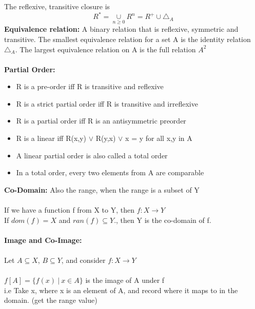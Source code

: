 \documentclass[a4paper,10pt]{article}
\begin{document}
\newline 
The reflexive, transitive closure is 
\begin{equation*}
R^{*} = \underset{n \geq 0}{\cup} R^{n} = R^{+}\cup \triangle_{A}
\end{equation*}
\newline
\textcolor{BlueGreen}{\textbf{Equivalence relation:}} A binary relation that is reflexive, symmetric and transitive. The smallest equivalence relation for a set A is the identity relation $\triangle_{A}$. The largest equivalence relation on A is the full relation $A^{2}$\\\\
\textcolor{BlueGreen}{\textbf{Partial Order:}} \\
\renewcommand{\labelitemi}{\textperiodcentered}
\begin{itemize}
\item R is a \textcolor{BlueGreen}{pre-order} iff R is transitive and reflexive 
\item R is a \textcolor{BlueGreen}{strict partial order} iff R is transitive and irreflexive 
\item R is a \textcolor{BlueGreen}{partial order} iff R is an antisymmetric preorder 
\item R is a \textcolor{BlueGreen}{linear} iff R(x,y) $\lor$ R(y,x) $\lor$ x = y for all x,y in A
\item A linear partial order is also called a \textcolor{BlueGreen}{total} order 
\item In a total order, every two elements from A are \textcolor{BlueGreen}{comparable}  
\end{itemize}
\textcolor{BlueGreen}{\textbf{Co-Domain:}} Also the range, when the range is a subset of Y\\ \\ 
If we have a function f from X to Y, then $f: X \rightarrow Y$ \\
If $dom(f) = X$ and $ran(f) \subseteq Y$., then Y is the co-domain of f. \\ \\
\textcolor{BlueGreen}{\textbf{Image and Co-Image:}} \\\\
Let $A \subseteq X$, $B \subseteq Y$, and consider $f: X \rightarrow Y$ \\ \\
$f[A] = \{f(x) \ | \ x \in A\}$ is the \textcolor{BlueGreen}{image} of A under f \\
i.e Take x, where x is an element of A, and record where it maps to in the domain. (get the range value)\\\\
\end{document}
